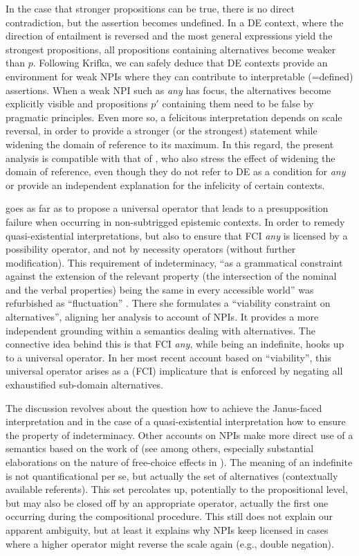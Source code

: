 \documentclass[output=paper,colorlinks,citecolor=brown,
]{langscibook}
\begin{document}
In the case that stronger propositions can be true, there is no direct contradiction, but the assertion becomes
undefined. In a DE context, where the direction of entailment is reversed and the most general expressions yield the
strongest propositions, all propositions containing alternatives become weaker than $p$. Following Krifka, we can
safely deduce that DE contexts provide an environment for weak NPIs where they can contribute to interpretable
(=defined) assertions. When a weak NPI such as \textit{any} has focus, the alternatives become explicitly visible and
propositions $p'$ containing them need to be false by pragmatic principles. Even more so, a felicitous
interpretation depends on scale reversal, in order to provide a stronger (or the strongest) statement while widening the domain of reference to its maximum. In this regard, the present analysis is compatible with that of \citet{kadmonlandmann1993}, who also stress the effect of widening the domain of reference, even though they do not refer to DE as a condition for \textit{any} or provide an independent explanation for the infelicity of certain contexts.

\citet{dayal1998} goes as far as to propose a universal operator that leads to a
presupposition failure when occurring in non-subtrigged epistemic contexts. In order to remedy quasi-existential
interpretations, but also to ensure that FCI {\em any} is licensed by a possibility operator, and not by necessity
operators (without further modification). This requirement of indeterminacy, ``as a grammatical constraint against
the extension of the relevant property (the intersection of the nominal and the verbal properties) being the same in
every accessible world'' \citep[237]{dayal2009} was refurbished as “fluctuation” 
\citep{dayal2013}. There she formulates a “viability constraint on alternatives”, aligning her analysis to  account of NPIs. It provides a more independent grounding within a semantics dealing with alternatives. The connective
idea behind this is that FCI {\em any}, while being an indefinite, hooks up to a universal operator. In her most recent
account based on “viability”, this universal operator arises as a (FCI) implicature that is enforced by negating all
exhaustified sub-domain alternatives.

The discussion revolves about the question how to achieve the Janus-faced interpretation and in the case of a
quasi-existential interpretation how to ensure the property of indeterminacy. Other accounts on NPIs make more direct use
of a semantics based on the work of \citet{hamblin1973}
(see \citealt{ramchand1997,kratzershimo2002,kratzer2005,novelromero2009} among others, especially substantial elaborations
on the nature of free-choice effects in \citealt{fox2007,chierchia2013}). The meaning of an indefinite is
not quantificational per se, but actually the set of alternatives (contextually available referents). This set percolates up,
potentially to the propositional level, but may also be closed off by an appropriate operator, actually the first one
occurring during the compositional procedure. This still does not explain our apparent ambiguity, but at least it
explains why NPIs keep licensed in cases where a higher operator might reverse the scale again (e.g., double negation).
\end{document}
